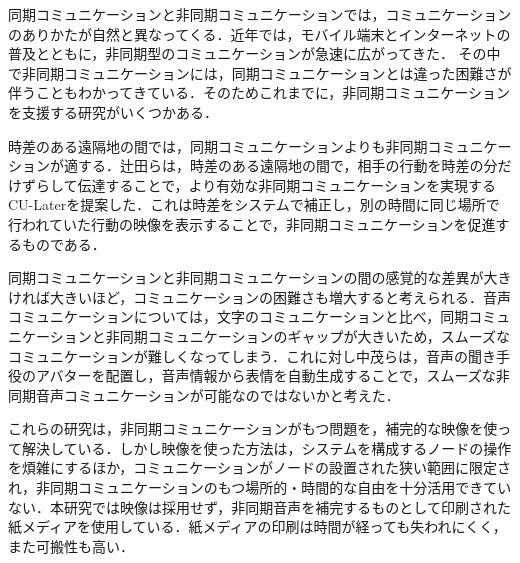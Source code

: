 \documentclass[submit,techrep,noauthor]{ipsj}
\begin{document}
同期コミュニケーションと非同期コミュニケーションでは，コミュニケーションのありかたが自然と異なってくる．近年では，モバイル端末とインターネットの普及とともに，非同期型のコミュニケーションが急速に広がってきた\cite{white_paper_infor_commun_japan-1}．
その中で非同期コミュニケーションには，同期コミュニケーションとは違った困難さが伴うこともわかってきている．そのためこれまでに，非同期コミュニケーションを支援する研究がいくつかある．\par
時差のある遠隔地の間では，同期コミュニケーションよりも非同期コミュニケーションが適する．辻田ら\cite{time-comu}は，時差のある遠隔地の間で，相手の行動を時差の分だけずらして伝達することで，より有効な非同期コミュニケーションを実現するCU-Laterを提案した．これは時差をシステムで補正し，別の時間に同じ場所で行われていた行動の映像を表示することで，非同期コミュニケーションを促進するものである．\par
同期コミュニケーションと非同期コミュニケーションの間の感覚的な差異が大きければ大きいほど，コミュニケーションの困難さも増大すると考えられる．音声コミュニケーションについては，文字のコミュニケーションと比べ，同期コミュニケーションと非同期コミュニケーションのギャップが大きいため，スムーズなコミュニケーションが難しくなってしまう．これに対し中茂ら\cite{hohoemi-service}は，音声の聞き手役のアバターを配置し，音声情報から表情を自動生成することで，スムーズな非同期音声コミュニケーションが可能なのではないかと考えた．\par
これらの研究は，非同期コミュニケーションがもつ問題を，補完的な映像を使って解決している．しかし映像を使った方法は，システムを構成するノードの操作を煩雑にするほか，コミュニケーションがノードの設置された狭い範囲に限定され，非同期コミュニケーションのもつ場所的・時間的な自由を十分活用できていない．本研究では映像は採用せず，非同期音声を補完するものとして印刷された紙メディアを使用している．紙メディアの印刷は時間が経っても失われにくく，また可搬性も高い．

\end{document}
